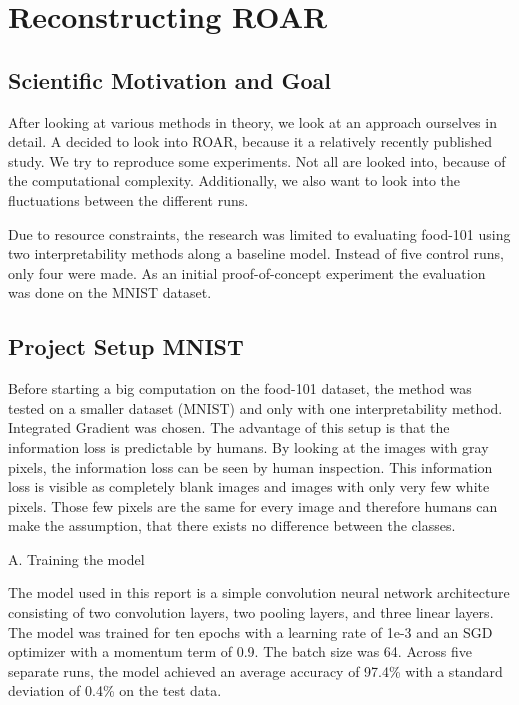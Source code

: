 
\chapter{Reconstructing ROAR} %
\label{sec:project}

\section{Scientific Motivation and Goal}


After looking at various methods in theory, we look at an approach ourselves in detail. A decided to look into ROAR\cite{hooker2019benchmark}, because it a relatively recently published study. We try to reproduce some experiments. Not all are looked into, because of the computational complexity. Additionally, we also want to look into the fluctuations between the different runs.


Due to resource constraints, the research was limited to evaluating food-101 \cite{bossard14} using two interpretability methods along a baseline model. Instead of five control runs, only four were made. As an initial proof-of-concept experiment the evaluation was done on the MNIST dataset\cite{deng2012mnist}.

\section{Project Setup MNIST}

Before starting a big computation on the food-101 dataset, the method was tested on a smaller dataset (MNIST) and only with one interpretability method. Integrated Gradient was chosen. The advantage of this setup is that the information loss is predictable by humans. By looking at the images with gray pixels, the information loss can be seen by human inspection. This information loss is visible as completely blank images and images with only very few white pixels. Those few pixels are the same for every image and therefore humans can make the assumption, that there exists no difference between the classes.


A. Training the model

The model used in this report is a simple convolution neural network architecture consisting of two convolution layers, two pooling layers, and three linear layers. The model was trained for ten epochs with a learning rate of 1e-3 and an SGD optimizer with a momentum term of 0.9. The batch size was 64. Across five separate runs, the model achieved an average accuracy of 97.4\% with a standard deviation of 0.4\% on the test data. 

